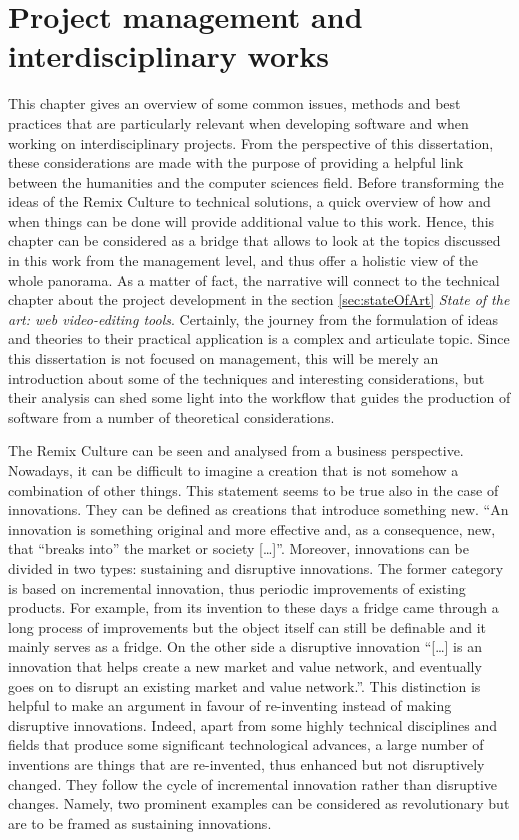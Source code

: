 \chapter{Project management and interdisciplinary works}
\label{ch:ch2_ProjectManagement}


This chapter gives an overview of some common issues, methods and best practices that are particularly relevant when developing software and when working on interdisciplinary projects. From the perspective of this dissertation, these considerations are made with the purpose of providing a helpful link between the humanities and the computer sciences field. Before transforming the ideas of the Remix Culture to technical solutions, a quick overview of how and when things can be done will provide additional value to this work. Hence, this chapter can be considered as a bridge that allows to look at the topics discussed in this work from the management level, and thus offer a holistic view of the whole panorama. As a matter of fact, the narrative will connect to the technical chapter about the project development in the section \ref{sec:stateOfArt} \emph{State of the art: web video-editing tools}.
Certainly, the journey from the formulation of ideas and theories to their practical application is a complex and articulate topic. Since this dissertation is not focused on management, this will be merely an introduction about some of the techniques and interesting considerations, but their analysis can shed some light into the workflow that guides the production of software from a number of theoretical considerations.

The Remix Culture can be seen and analysed from a business perspective. Nowadays, it can be difficult to imagine a creation that is not somehow a combination of other things. This statement seems to be true also in the case of innovations. They can be defined as creations that introduce something new. “An innovation is something original and more effective and, as a consequence, new, that “breaks into” the market or society […]”. Moreover, innovations can be divided in two types: sustaining and disruptive innovations. The former category is based on incremental innovation, thus periodic improvements of existing products. For example, from its invention to these days a fridge came through a long process of improvements but the object itself can still be definable and it mainly serves as a fridge. On the other side a disruptive innovation “[…] is an innovation that helps create a new market and value network, and eventually goes on to disrupt an existing market and value network.”.
This distinction is helpful to make an argument in favour of re-inventing instead of making disruptive innovations. Indeed, apart from some highly technical disciplines and fields that produce some significant technological advances, a large number of inventions are things that are re-invented, thus enhanced but not disruptively changed. They follow the cycle of incremental innovation rather than disruptive changes. Namely, two prominent examples can be considered as revolutionary but are to be framed as sustaining innovations.

